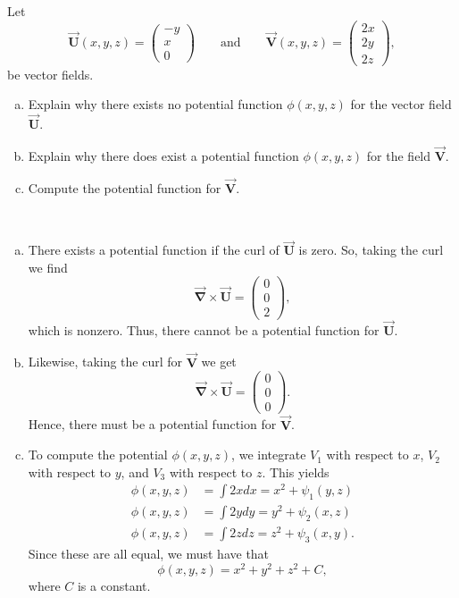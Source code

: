 \documentclass[12pt]{article} %
\newcommand{\grad}{\boldsymbol{\vec{\nabla}}}
\newcommand{\vecfieldV}{\boldsymbol{\vec{V}}}
\newcommand{\vecfieldU}{\boldsymbol{\vec{U}}}
\begin{document}
\newpage
\begin{problem}
	Let 
	\[
	\vecfieldU(x,y,z) = \begin{pmatrix} -y \\ x \\ 0 \end{pmatrix} \qquad \textrm{and} \qquad \vecfieldV(x,y,z) = \begin{pmatrix} 2x \\ 2y \\ 2z \end{pmatrix},
	\] 
	be vector fields.  
	\begin{enumerate}[(a)]
		\item Explain why there exists no potential function $\phi(x,y,z)$ for the vector field $\vecfieldU$.
		\item Explain why there does exist a potential function $\phi(x,y,z)$ for the field $\vecfieldV$.
		\item Compute the potential function for $\vecfieldV$.
	\end{enumerate}
\end{problem}
\begin{solution}~
    \begin{enumerate}[(a)]
        \item There exists a potential function if the curl of $\vecfieldU$ is zero.  So, taking the curl we find
        \[
        \grad \times \vecfieldU = \begin{pmatrix} 0 \\ 0 \\ 2 \end{pmatrix},
        \]
        which is nonzero. Thus, there cannot be a potential function for $\vecfieldU$.
        
        \item Likewise, taking the curl for $\vecfieldV$ we get
        \[
            \grad\times \vecfieldU = \begin{pmatrix} 0 \\ 0 \\ 0 \end{pmatrix}.
        \]
        Hence, there must be a potential function for $\vecfieldV$.  
        
        \item To compute the potential $\phi(x,y,z)$, we integrate $V_1$ with respect to $x$, $V_2$ with respect to $y$, and $V_3$ with respect to $z$.  This yields
        \begin{align*}
            \phi(x,y,z) &= \int 2x dx = x^2+\psi_1(y,z)\\
            \phi(x,y,z) &= \int 2y dy = y^2+\psi_2(x,z)\\
            \phi(x,y,z) &= \int 2z dz = z^2+\psi_3(x,y).
        \end{align*}
        Since these are all equal, we must have that
        \[
        \boxed{\phi(x,y,z) = x^2+y^2+z^2+C,}
        \]
        where $C$ is a constant.
    \end{enumerate}
\end{solution}
\end{document}
